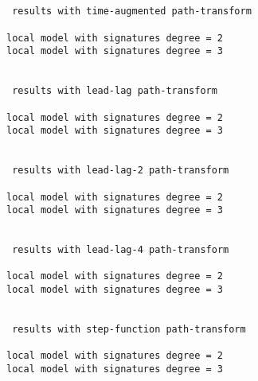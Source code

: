 \documentclass[11pt]{article}
\begin{document}
    \begin{Verbatim}[commandchars=\\\{\}]

 
 results with time-augmented path-transform 

local model with signatures degree = 2
local model with signatures degree = 3

 
 results with lead-lag path-transform 

local model with signatures degree = 2
local model with signatures degree = 3

 
 results with lead-lag-2 path-transform 

local model with signatures degree = 2
local model with signatures degree = 3

 
 results with lead-lag-4 path-transform 

local model with signatures degree = 2
local model with signatures degree = 3

 
 results with step-function path-transform 

local model with signatures degree = 2
local model with signatures degree = 3

    \end{Verbatim}

    \begin{center}
    \end{center}
    { \hspace*{\fill} \\}
    
\end{document}
